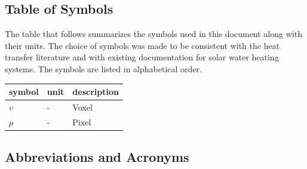 \documentclass[12pt]{article}
\begin{document}
\subsection{Table of Symbols}

The table that follows summarizes the symbols used in this document along with
their units.  The choice of symbols was made to be consistent with the heat
transfer literature and with existing documentation for solar water heating
systems.  The symbols are listed in alphabetical order.

\renewcommand{\arraystretch}{1.2}
\noindent \begin{longtable*}{l l p{12cm}} \toprule
  \textbf{symbol} & \textbf{unit} & \textbf{description}\\
  \midrule
  $v$ & - & Voxel
  \\
  $p$ & - & Pixel
  \\
  \bottomrule
\end{longtable*}


\subsection{Abbreviations and Acronyms}
\end{document}
